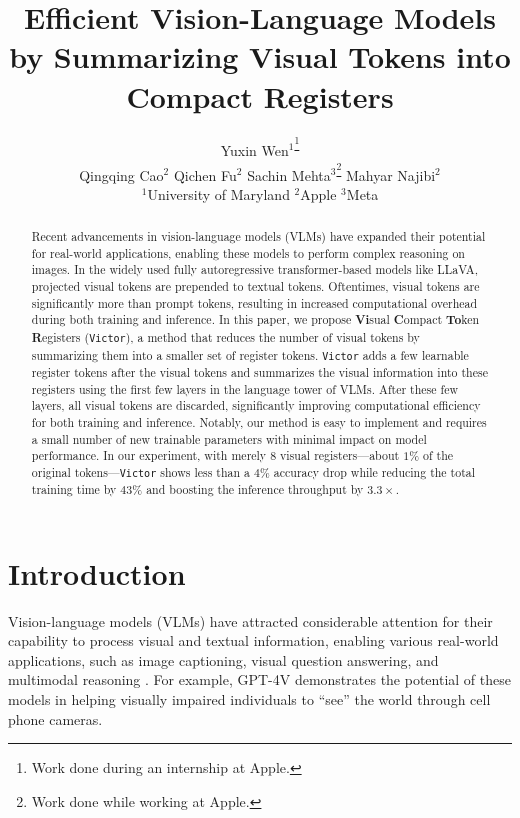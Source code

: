 \documentclass{article} %
\title{Efficient Vision-Language Models by Summarizing Visual Tokens into Compact Registers}
\author{Yuxin Wen$^1$\textsuperscript{\thanks{Work done during an internship at Apple.}}\\
\And
Qingqing Cao$^2$
\And Qichen Fu$^2$
\And Sachin Mehta$^3$\textsuperscript{\thanks{Work done while working at Apple.}}
\And Mahyar Najibi$^2$ \AND
\vspace*{-0.8cm}\\
$^1$University of Maryland \quad \quad $^2$Apple \quad \quad $^3$Meta
}
\begin{document}
\maketitle
\begin{abstract}
Recent advancements in vision-language models (VLMs) have expanded their potential for real-world applications, enabling these models to perform complex reasoning on images. 
In the widely used fully autoregressive transformer-based models like LLaVA, projected visual tokens are prepended to textual tokens. Oftentimes, visual tokens are significantly more than prompt tokens, resulting in increased computational overhead during both training and inference. In this paper, we propose \textbf{Vi}sual \textbf{C}ompact \textbf{To}ken \textbf{R}egisters (\texttt{Victor}), a method that reduces the number of visual tokens by summarizing them into a smaller set of register tokens. \texttt{Victor} adds a few learnable register tokens after the visual tokens and summarizes the visual information into these registers using the first few layers in the language tower of VLMs. After these few layers, all visual tokens are discarded, significantly improving computational efficiency for both training and inference. Notably, our method is easy to implement and requires a small number of new trainable parameters with minimal impact on model performance.
In our experiment, with merely $8$ visual registers—about $1\%$ of the original tokens—\texttt{Victor} shows less than a $4\%$ accuracy drop while reducing the total training time by $43\%$ and boosting the inference throughput by $3.3\times$.
\end{abstract}

\section{Introduction}
Vision-language models (VLMs) have attracted considerable attention for their capability to process visual and textual information, enabling various real-world applications, such as image captioning, visual question answering, and multimodal reasoning \citep{openai2gpt4v, liu2024visual}. For example, GPT-4V \citep{openai2gpt4v} demonstrates the potential of these models in helping visually impaired individuals to ``see'' the world through cell phone cameras.
\end{document}
